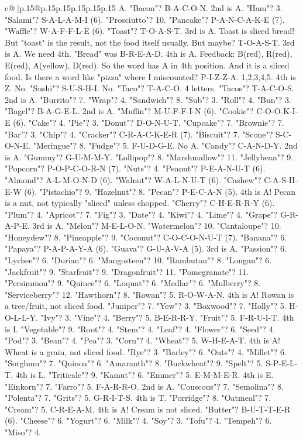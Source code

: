 \documentclass{article}
\begin{document}
{\begin{supertabular}{c@{$\;$}|p{.15\linewidth}@{}p{.15\linewidth}p{.15\linewidth}p{.15\linewidth}p{.15\linewidth}p{.15\linewidth}}
{{{A. "Bacon"? B{-}A{-}C{-}O{-}N. 2nd is A. "Ham"? 3. "Salami"? S{-}A{-}L{-}A{-}M{-}I (6). "Prosciutto"? 10. "Pancake"? P{-}A{-}N{-}C{-}A{-}K{-}E (7). "Waffle"? W{-}A{-}F{-}F{-}L{-}E (6). "Toast"? T{-}O{-}A{-}S{-}T. 3rd is A. Toast is sliced bread! But "toast" is the result, not the food itself usually. But maybe? T{-}O{-}A{-}S{-}T. 3rd is A. We need 4th. "Bread" was B{-}R{-}E{-}A{-}D. 4th is A. Feedback: B(red), R(red), E(red), A(yellow), D(red). So the word has A in 4th position. And it is a sliced food. Is there a word like "pizza" where I miscounted? P{-}I{-}Z{-}Z{-}A. 1,2,3,4,5. 4th is Z. No. "Sushi"? S{-}U{-}S{-}H{-}I. No. "Taco"? T{-}A{-}C{-}O. 4 letters. "Tacos"? T{-}A{-}C{-}O{-}S. 2nd is A. "Burrito"? 7. "Wrap"? 4. "Sandwich"? 8. "Sub"? 3. "Roll"? 4. "Bun"? 3. "Bagel"? B{-}A{-}G{-}E{-}L. 2nd is A. "Muffin"? M{-}U{-}F{-}F{-}I{-}N (6). "Cookie"? C{-}O{-}O{-}K{-}I{-}E (6). "Cake"? 4. "Pie"? 3. "Donut"? D{-}O{-}N{-}U{-}T. "Cupcake"? 7. "Brownie"? 7. "Bar"? 3. "Chip"? 4. "Cracker"? C{-}R{-}A{-}C{-}K{-}E{-}R (7). "Biscuit"? 7. "Scone"? S{-}C{-}O{-}N{-}E. "Meringue"? 8. "Fudge"? 5. F{-}U{-}D{-}G{-}E. No A. "Candy"? C{-}A{-}N{-}D{-}Y. 2nd is A. "Gummy"? G{-}U{-}M{-}M{-}Y. "Lollipop"? 8. "Marshmallow"? 11. "Jellybean"? 9. "Popcorn"? P{-}O{-}P{-}C{-}O{-}R{-}N (7). "Nuts"? 4. "Peanut"? P{-}E{-}A{-}N{-}U{-}T (6). "Almond"? A{-}L{-}M{-}O{-}N{-}D (6). "Walnut"? W{-}A{-}L{-}N{-}U{-}T (6). "Cashew"? C{-}A{-}S{-}H{-}E{-}W (6). "Pistachio"? 9. "Hazelnut"? 8. "Pecan"? P{-}E{-}C{-}A{-}N (5). 4th is A! Pecan is a nut, not typically "sliced" unless chopped. "Cherry"? C{-}H{-}E{-}R{-}R{-}Y (6). "Plum"? 4. "Apricot"? 7. "Fig"? 3. "Date"? 4. "Kiwi"? 4. "Lime"? 4. "Grape"? G{-}R{-}A{-}P{-}E. 3rd is A. "Melon"? M{-}E{-}L{-}O{-}N. "Watermelon"? 10. "Cantaloupe"? 10. "Honeydew"? 8. "Pineapple"? 9. "Coconut"? C{-}O{-}C{-}O{-}N{-}U{-}T (7). "Banana"? 6. "Papaya"? P{-}A{-}P{-}A{-}Y{-}A (6). "Guava"? G{-}U{-}A{-}V{-}A (5). 3rd is A. "Passion"? 6. "Lychee"? 6. "Durian"? 6. "Mangosteen"? 10. "Rambutan"? 8. "Longan"? 6. "Jackfruit"? 9. "Starfruit"? 9. "Dragonfruit"? 11. "Pomegranate"? 11. "Persimmon"? 9. "Quince"? 6. "Loquat"? 6. "Medlar"? 6. "Mulberry"? 8. "Serviceberry"? 12. "Hawthorn"? 8. "Rowan"? 5. R{-}O{-}W{-}A{-}N. 4th is A! Rowan is a tree/fruit, not sliced food. "Juniper"? 7. "Yew"? 3. "Boxwood"? 7. "Holly"? 5. H{-}O{-}L{-}L{-}Y. "Ivy"? 3. "Vine"? 4. "Berry"? 5. B{-}E{-}R{-}R{-}Y. "Fruit"? 5. F{-}R{-}U{-}I{-}T. 4th is I. "Vegetable"? 9. "Root"? 4. "Stem"? 4. "Leaf"? 4. "Flower"? 6. "Seed"? 4. "Pod"? 3. "Bean"? 4. "Pea"? 3. "Corn"? 4. "Wheat"? 5. W{-}H{-}E{-}A{-}T. 4th is A! Wheat is a grain, not sliced food. "Rye"? 3. "Barley"? 6. "Oats"? 4. "Millet"? 6. "Sorghum"? 7. "Quinoa"? 6. "Amaranth"? 8. "Buckwheat"? 9. "Spelt"? 5. S{-}P{-}E{-}L{-}T. 4th is L. "Triticale"? 9. "Kamut"? 6. "Emmer"? 5. E{-}M{-}M{-}E{-}R. 4th is E. "Einkorn"? 7. "Farro"? 5. F{-}A{-}R{-}R{-}O. 2nd is A. "Couscous"? 7. "Semolina"? 8. "Polenta"? 7. "Grits"? 5. G{-}R{-}I{-}T{-}S. 4th is T. "Porridge"? 8. "Oatmeal"? 7. "Cream"? 5. C{-}R{-}E{-}A{-}M. 4th is A! Cream is not sliced. "Butter"? B{-}U{-}T{-}T{-}E{-}R (6). "Cheese"? 6. "Yogurt"? 6. "Milk"? 4. "Soy"? 3. "Tofu"? 4. "Tempeh"? 6. "Miso"? 4. }}}
\end{supertabular}}
\end{document}
